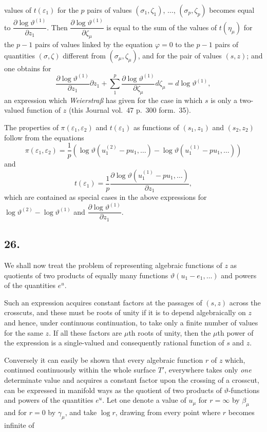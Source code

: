 \documentclass{article}
\begin{document}
values of $t(\varepsilon_{1})$ for the $p$ pairs of values $(\sigma_{1}, \zeta_{1})$, $\ldots$, $(\sigma_{p}, \zeta_{p})$ becomes equal to $\dfrac{\partial \log\vartheta^{(1)}}{\partial z_{1}}$. Then $\dfrac{\partial \log\vartheta^{(1)}}{\partial \zeta_{\mu}}$ is equal to the sum of the values of $t(\eta_{\mu})$ for the $p-1$ pairs of values linked by the equation $\varphi = 0$ to the $p-1$ pairs of quantities $(\sigma, \zeta)$ different from $(\sigma_{\mu}, \zeta_{\mu})$, and for the pair of values $(s, z)$; and one obtains for
\[ \frac{\partial \log\vartheta^{(1)}}{\partial z_{1}} \partial z_{1} + \sum_{1}^{p} \frac{\partial \log\vartheta^{(1)}}{\partial \zeta_{\mu}} d\zeta_{\mu} = d\log\vartheta^{(1)}, \]
an expression which \emph{Weierstraß} has given for the case in which $s$ is only a two-valued function of $z$ (this Journal vol.~47 p.~300 form.~35).

The properties of $\pi(\varepsilon_{1}, \varepsilon_{2})$ and $t(\varepsilon_{1})$ as functions of $(s_{1}, z_{1})$ and $(s_{2}, z_{2})$ follow from the equations
\[ \pi(\varepsilon_{1}, \varepsilon_{2}) = \frac{1}{p}\left(\log\vartheta(u_{1}^{(2)} - p u_{1}, \ldots) - \log\vartheta(u_{1}^{(1)} - p u_{1}, \ldots)\right) \]
and
\[ t(\varepsilon_{1}) = \frac{1}{p} \frac{\partial \log\vartheta(u_{1}^{(1)} - p u_{1}, \ldots)}{\partial z_{1}}, \]
which are contained as special cases in the above expressions for $\log\vartheta^{(2)} - \log\vartheta^{(1)}$ and $\dfrac{\partial \log\vartheta^{(1)}}{\partial z_{1}}$.

\subsection*{26.}

We shall now treat the problem of representing algebraic functions of $z$ as quotients of two products of equally many functions $\vartheta(u_{1}-e_{1}, \ldots)$ and powers of the quantities $e^{u}$.

Such an expression acquires constant factors at the passages of $(s, z)$ across the crosscuts, and these must be roots of unity if it is to depend algebraically on $z$ and hence, under continuous continuation, to take only a finite number of values for the same $z$. If all these factors are $\mu$th roots of unity, then the $\mu$th power of the expression is a single-valued and consequently rational function of $s$ and $z$.

Conversely it can easily be shown that every algebraic function $r$ of $z$ which, continued continuously within the whole surface $T'$, everywhere takes only \emph{one} determinate value and acquires a constant factor upon the crossing of a crosscut, can be expressed in manifold ways as the quotient of two products of $\vartheta$-functions and powers of the quantities $e^{u}$. Let one denote a value of $u_{\mu}$ for $r = \infty$ by $\beta_{\mu}$ and for $r = 0$ by $\gamma_{\mu}$, and take $\log r$, drawing from every point where $r$ becomes infinite of
\end{document}
